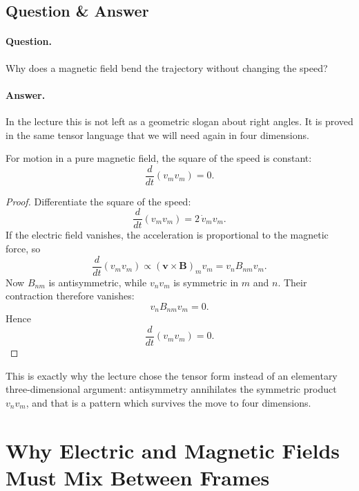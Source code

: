 \subsection{Question \& Answer}

\paragraph{Question.} Why does a magnetic field bend the trajectory without changing the speed?

\paragraph{Answer.} In the lecture this is not left as a geometric slogan about right angles. It is proved in the same tensor language that we will need again in four dimensions.

\begin{proposition}
For motion in a pure magnetic field, the square of the speed is constant:
\begin{equation}
\frac{d}{dt}(v_m v_m)=0.
\end{equation}
\end{proposition}

\begin{proof}
Differentiate the square of the speed:
\begin{equation}
\frac{d}{dt}(v_m v_m)=2\,\dot v_m v_m.
\end{equation}
If the electric field vanishes, the acceleration is proportional to the magnetic force, so
\begin{equation}
\frac{d}{dt}(v_m v_m)
\propto
(\mathbf v\times \mathbf B)_m v_m
=
v_n B_{nm} v_m.
\end{equation}
Now \(B_{nm}\) is antisymmetric, while \(v_n v_m\) is symmetric in \(m\) and \(n\). Their contraction therefore vanishes:
\begin{equation}
v_n B_{nm} v_m = 0.
\end{equation}
Hence
\begin{equation}
\frac{d}{dt}(v_m v_m)=0.
\end{equation}
\end{proof}

This is exactly why the lecture chose the tensor form instead of an elementary three-dimensional argument: antisymmetry annihilates the symmetric product \(v_n v_m\), and that is a pattern which survives the move to four dimensions.

\section{Why Electric and Magnetic Fields Must Mix Between Frames}


